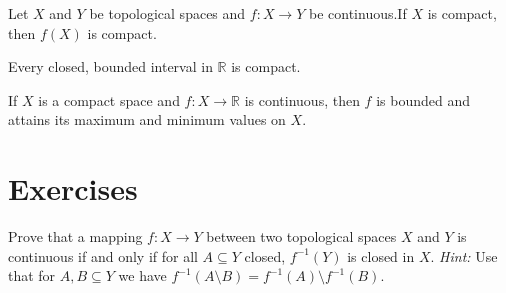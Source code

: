 \begin{theorem}
	Let $X$ and $Y$ be topological spaces and $f: X \to Y$ be continuous.If $X$ is compact, then $f(X)$ is compact.
	\label{thm:main_theorem_compactness}
\end{theorem}

\begin{proposition}
	Every closed, bounded interval in $\mathbb{R}$ is compact.
\end{proposition}

\begin{theorem}
	If $X$ is a compact space and $f: X \to \mathbb{R}$ is continuous, then $f$ is bounded and attains its maximum and minimum values on $X$.
	\label{thm:extreme_value_theorem}
\end{theorem}

\section*{Exercises}

\begin{exercise}
	Prove that a mapping $f: X \to Y$ between two topological spaces $X$ and $Y$ is continuous if and only if for all $A \subseteq Y$ closed, $f^{-1}(Y)$ is closed in $X$. \textit{Hint:} Use that for $A,B \subseteq Y$ we have $f^{-1}(A \setminus B) = f^{-1}(A) \setminus f^{-1}(B)$.
\end{exercise}
